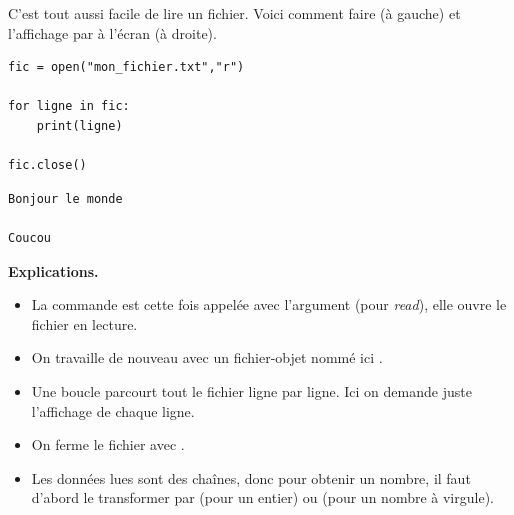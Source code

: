 \documentclass[11pt,class=report,crop=false]{standalone}
\begin{document}
\begin{cours}

C'est tout aussi facile de lire un fichier.
Voici comment faire (à gauche) et l'affichage par \Python{} à l'écran (à droite).
\begin{center}
\begin{minipage}{0.5\textwidth}
\begin{lstlisting}
fic = open("mon_fichier.txt","r")

for ligne in fic:
    print(ligne)

fic.close()
\end{lstlisting}
\end{minipage}
\begin{minipage}{0.3\textwidth}
\begin{lstlisting}
Bonjour le monde

Coucou
\end{lstlisting}
\end{minipage}
\end{center}

\textbf{Explications.}
\begin{itemize}
  \item La commande  est cette fois appelée avec l'argument  (pour \emph{read}), elle ouvre le fichier en lecture.
  
  \item On travaille de nouveau avec un fichier-objet nommé ici .
  
  \item Une boucle parcourt tout le fichier ligne par ligne. Ici on demande juste l'affichage de chaque ligne.
  
  \item On ferme le fichier avec .  
  
  \item Les données lues sont des chaînes, donc pour obtenir un nombre, il faut d'abord le transformer par  (pour un entier) ou  
   (pour un nombre à virgule).

\end{itemize}
  
\end{cours}



\end{document}
